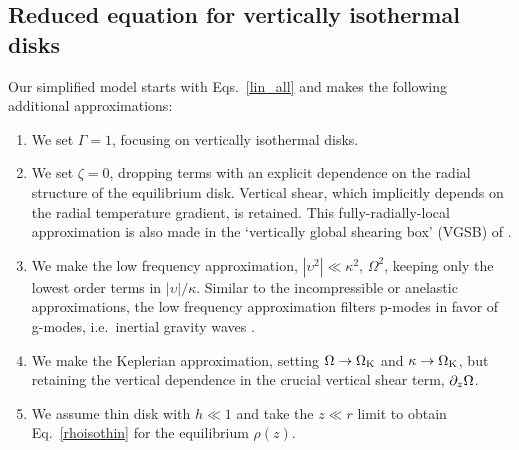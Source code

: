 \subsection{Reduced equation for vertically isothermal disks}\label{sec:simplified}

Our simplified model starts with  Eqs.\ \ref{lin_all} 
and makes the following additional approximations:

\begin{enumerate}
 
 \item We set $\Gamma = 1$, focusing on vertically isothermal disks.
  
\item  We set $\zeta = 0$,  dropping terms with an explicit dependence on the 
radial structure of the equilibrium disk.  Vertical shear, which implicitly depends on the radial
temperature gradient, is retained.  This fully-radially-local approximation is also made in the
 `vertically global shearing box' (VGSB) of . 

\item We make the low frequency approximation, $|\upsilon^2|\ll \kappa^2,\,\Omega^2$,
keeping only the lowest order terms in $|\upsilon|/\kappa$.  Similar to the 
incompressible  or anelastic  approximations,
the low frequency approximation filters p-modes in favor of g-modes, i.e.\ inertial
gravity waves \citep{lubow93}.

\item We make the Keplerian approximation, setting $\Omega \rightarrow \Omega_{\rm K}$ 
and $\kappa \rightarrow \Omega_{\rm K}$, but retaining the vertical dependence 
in the crucial vertical shear term,
  $\partial_z\Omega$. 
  
\item We assume thin disk with $h\ll 1$ and take the $z \ll r$ limit to 
  obtain Eq.\ \ref{rhoisothin} for the equilibrium $\rho(z)$. 

\end{enumerate}
